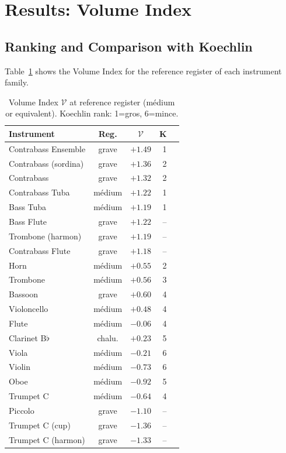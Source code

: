 \documentclass[journal]{IEEEtran}
\begin{document}
\section{Results: Volume Index}
\label{sec:volume}

\subsection{Ranking and Comparison with Koechlin}

Table~\ref{tab:volume_top} shows the Volume Index for the reference register of each instrument family.

\begin{table}[!t]
\centering
\caption{Volume Index $\mathcal{V}$ at reference register (médium or equivalent). Koechlin rank: 1=gros, 6=mince.}
\label{tab:volume_top}
\small
\begin{tabular}{@{}lccrc@{}}
\toprule
\textbf{Instrument} & \textbf{Reg.} & $\mathcal{V}$ & \textbf{K} \\
\midrule
Contrabass Ensemble     & grave   & $+1.49$ & 1 \\
Contrabass (sordina)    & grave   & $+1.36$ & 2 \\
Contrabass              & grave   & $+1.32$ & 2 \\
Contrabass Tuba         & médium  & $+1.22$ & 1 \\
Bass Tuba               & médium  & $+1.19$ & 1 \\
Bass Flute              & grave   & $+1.22$ & -- \\
Trombone (harmon)       & grave   & $+1.19$ & -- \\
Contrabass Flute        & grave   & $+1.18$ & -- \\
Horn                    & médium  & $+0.55$ & 2 \\
Trombone                & médium  & $+0.56$ & 3 \\
Bassoon                 & grave   & $+0.60$ & 4 \\
Violoncello             & médium  & $+0.48$ & 4 \\
Flute                   & médium  & $-0.06$ & 4 \\
Clarinet B$\flat$       & chalu.  & $+0.23$ & 5 \\
Viola                   & médium  & $-0.21$ & 6 \\
Violin                  & médium  & $-0.73$ & 6 \\
Oboe                    & médium  & $-0.92$ & 5 \\
Trumpet C               & médium  & $-0.64$ & 4 \\
Piccolo                 & grave   & $-1.10$ & -- \\
Trumpet C (cup)         & grave   & $-1.36$ & -- \\
Trumpet C (harmon)      & grave   & $-1.33$ & -- \\
\bottomrule
\end{tabular}
\end{table}
\end{document}
